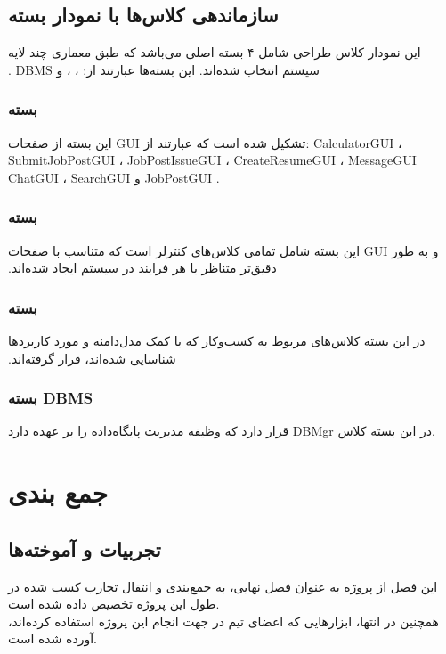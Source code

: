 \documentclass[12pt]{article}
\begin{document}
	\subsection{سازماندهی کلاس‌ها با نمودار بسته}
	‫این‬‫ نمودار‬ ‫کلاس‬ ‫طراحی‬ ‫شامل ۴‬ ‫بسته‬ ‫اصلی‬ ‫می‬‌‫باشد ‬‫که‬ ‫طبق‬ ‫معماری‬ ‫چند لایه‬ ‫سیستم‬ ‫انتخاب‬ ‫شده‌اند‪.‬ ‬‫این‬ ‫بسته‌ها ‬‫عبارتند‬ ‫از:
	،
	،
	و DBMS .

	\subsubsection{بسته }
	‫این‬‫ بسته‬ ‫از‬ ‫صفحات‬ ‫‪GUI‬‬ ‫تشکیل‬ ‫شده‬ ‫است‬ ‫که‬ ‫عبارتند‬ ‫از‬:
	CalculatorGUI
	، SubmitJobPostGUI
	، JobPostIssueGUI
	، CreateResumeGUI
	، MessageGUI ChatGUI
	، SearchGUI
	و
	 JobPostGUI .

	\subsubsection{بسته }
	‫این‬‫ بسته‬ ‫شامل‬ ‫تمامی‬ ‫کلاس‌های‬‫ کنترلر‬ ‫است‬ ‫که‬ ‫متناسب‬ ‫با‬ ‫صفحات‬ ‫‪GUI‬‬ ‫و‬ ‫به‬ ‫طور‬ ‫دقیق‌تر‬‫ متناظر‬ ‫با‬ ‫هر‬ ‫فرایند‬ ‫در ‬‫سیستم‬ ‫ایجاد‬ ‫شده‌اند‬‫‪.‬‬
	\subsubsection{بسته }
	‫در ‬‫این‬ ‫بسته‬ ‫کلاس‌های ‬‫مربوط‬ ‫به‬ ‫کسب‬‌‫و‬‫کار‬ ‫که‬ ‫با‬ ‫کمک‬ ‫مدل‬‌‫دامنه‬ ‫و‬ ‫مورد ‬کاربردها‬ ‫شناسایی‬ ‫شده‬‌‫اند‪،‬ ‬‫قرار‬ ‫گرفته‬‫‌اند‬‫‪.‬‬
	\subsubsection{بسته DBMS}
	‫در‬‫ این‬ ‫بسته‬ کلاس ‫DBMgr‬‬ ‫قرار‬ ‫دارد‬ ‫که‬ ‫وظیفه‬ ‫مدیریت‬ ‫پایگاه‌داده‬ ‫را‬ ‫بر عهده‬ ‫دارد‬.
	\newpage

	\section{جمع بندی}
	\subsection{تجربیات و آموخته‌ها‬}
	این فصل از پروژه به عنوان فصل نهایی، به جمع‌بندی و انتقال تجارب کسب شده در طول این پروژه تخصیص داده شده است.\\
	همچنین در انتها، ابزارهایی که اعضای تیم در جهت انجام این پروژه استفاده کرده‌اند، آورده شده است.
\end{document}
